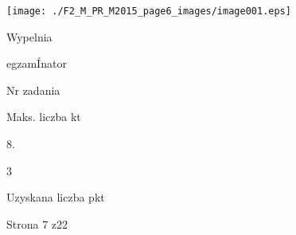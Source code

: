 \documentclass[a4paper,12pt]{article}
\begin{document}
\begin{center}
\texttt{[image: ./F2\_M\_PR\_M2015\_page6\_images/image001.eps]}
\end{center}
Wypelnia

egzamÍnator

Nr zadania

Maks. liczba kt

8.

3

Uzyskana liczba pkt

Strona 7 z22
\end{document}
